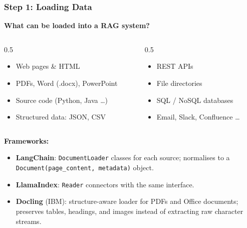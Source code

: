 \begin{frame}[fragile]\frametitle{Step 1: Loading Data}

\textbf{What can be loaded into a RAG system?}

\begin{columns}
  \begin{column}[T]{0.5\linewidth}
    \begin{itemize}
      \item Web pages \& HTML
      \item PDFs, Word (.docx), PowerPoint
      \item Source code (Python, Java \ldots)
      \item Structured data: JSON, CSV
    \end{itemize}
  \end{column}
  \begin{column}[T]{0.5\linewidth}
    \begin{itemize}
      \item REST APIs
      \item File directories
      \item SQL / NoSQL databases
      \item Email, Slack, Confluence \ldots
    \end{itemize}
  \end{column}
\end{columns}

\vspace{0.5em}
\textbf{Frameworks:}
\begin{itemize}
  \item \textbf{LangChain}: \texttt{DocumentLoader} classes for each source; normalises to a \texttt{Document(page\_content, metadata)} object.
  \item \textbf{LlamaIndex}: \texttt{Reader} connectors with the same interface.
  \item \textbf{Docling} (IBM): structure-aware loader for PDFs and Office documents; preserves tables, headings, and images instead of extracting raw character streams.
\end{itemize}

\end{frame}

